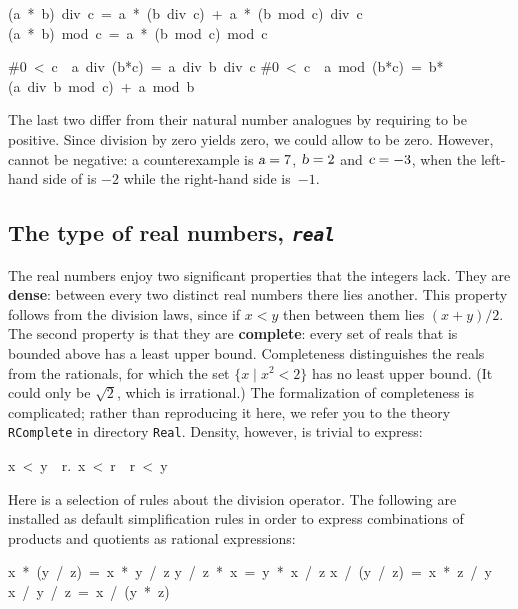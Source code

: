 \begin{isabelle}
(a\ *\ b)\ div\ c\ =\ a\ *\ (b\ div\ c)\ +\ a\ *\ (b\ mod\ c)\ div\ c%
\isanewline
(a\ *\ b)\ mod\ c\ =\ a\ *\ (b\ mod\ c)\ mod\ c%
\end{isabelle}

\begin{isabelle}
\#0\ <\ c\ \isasymLongrightarrow \ a\ div\ (b*c)\ =\ a\ div\ b\ div\ c%
\isanewline
\#0\ <\ c\ \isasymLongrightarrow \ a\ mod\ (b*c)\ =\ b*(a\ div\ b\ mod\
c)\ +\ a\ mod\ b%
\end{isabelle}
The last two differ from their natural number analogues by requiring
 to be positive.  Since division by zero yields zero, we could allow
\isa{c} to be zero.  However, \isa{c} cannot be negative: a counterexample
is
$\emph{\sl a} = 7$, $\emph{\sl b} = 2$ and $\emph{\sl c} = -3$, when the left-hand side of
\isa{zdiv_zmult2_eq} is $-2$ while the right-hand side is~$-1$.


\subsection{The type of real numbers, {\tt\slshape real}}

The real numbers enjoy two significant properties that the integers lack. 
They are
\textbf{dense}: between every two distinct real numbers there lies another.
This property follows from the division laws, since if $x<y$ then between
them lies $(x+y)/2$.  The second property is that they are
\textbf{complete}: every set of reals that is bounded above has a least
upper bound.  Completeness distinguishes the reals from the rationals, for
which the set $\{x\mid x^2<2\}$ has no least upper bound.  (It could only be
$\surd2$, which is irrational.)
The formalization of completeness is complicated; rather than
reproducing it here, we refer you to the theory \texttt{RComplete} in
directory \texttt{Real}.
Density, however, is trivial to express:
\begin{isabelle}
x\ <\ y\ \isasymLongrightarrow \ \isasymexists r.\ x\ <\ r\ \isasymand \ r\ <\ y%
\rulename{real_dense}
\end{isabelle}

Here is a selection of rules about the division operator.  The following
are installed as default simplification rules in order to express
combinations of products and quotients as rational expressions:
\begin{isabelle}
x\ *\ (y\ /\ z)\ =\ x\ *\ y\ /\ z
\isanewline
y\ /\ z\ *\ x\ =\ y\ *\ x\ /\ z
\isanewline
x\ /\ (y\ /\ z)\ =\ x\ *\ z\ /\ y
\isanewline
x\ /\ y\ /\ z\ =\ x\ /\ (y\ *\ z)
\end{isabelle}

